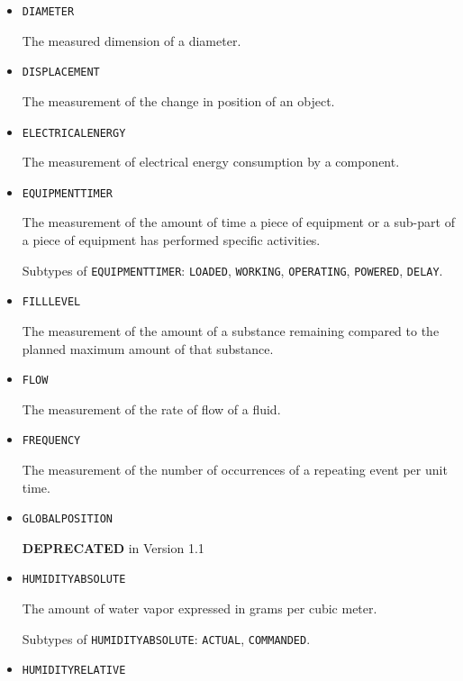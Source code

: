 \begin{itemize}
Subtypes of \texttt{DEPOSITION\textunderscore VOLUME}: \texttt{ACTUAL}, \texttt{COMMANDED}.

\item \texttt{DIAMETER}  

The measured dimension of a diameter.


\item \texttt{DISPLACEMENT}  

The measurement of the change in position of an object.


\item \texttt{ELECTRICAL\textunderscore ENERGY}  

The measurement of electrical energy consumption by a component.


\item \texttt{EQUIPMENT\textunderscore TIMER}  

The measurement of the amount of time a piece of equipment or a sub-part of a piece of equipment has performed specific activities.

Subtypes of \texttt{EQUIPMENT\textunderscore TIMER}: \texttt{LOADED}, \texttt{WORKING}, \texttt{OPERATING}, \texttt{POWERED}, \texttt{DELAY}.

\item \texttt{FILL\textunderscore LEVEL}  

The measurement of the amount of a substance remaining compared to the planned maximum amount of that substance.


\item \texttt{FLOW}  

The measurement of the rate of flow of a fluid.


\item \texttt{FREQUENCY}  

The measurement of the number of occurrences of a repeating event per unit time.


\item \texttt{GLOBAL\textunderscore POSITION}  

\textbf{DEPRECATED} in Version 1.1


\item \texttt{HUMIDITY\textunderscore ABSOLUTE}  

The amount of water vapor expressed in grams per cubic meter.

Subtypes of \texttt{HUMIDITY\textunderscore ABSOLUTE}: \texttt{ACTUAL}, \texttt{COMMANDED}.

\item \texttt{HUMIDITY\textunderscore RELATIVE}  


\end{itemize}

